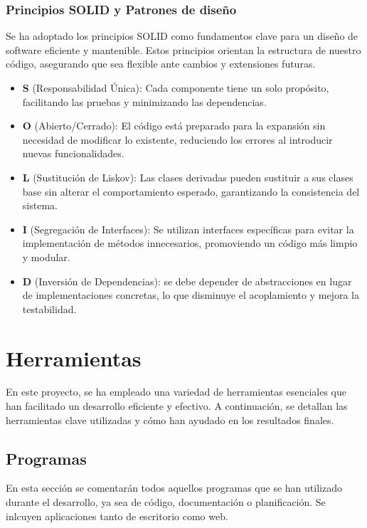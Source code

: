 \subsubsection{Principios SOLID y Patrones de diseño}
Se ha adoptado los principios SOLID como fundamentos clave para un diseño de software eficiente y mantenible. Estos principios orientan la estructura de nuestro código, asegurando que sea flexible ante cambios y extensiones futuras. 
\begin{mdframed}[linewidth=1pt, linecolor=black, leftmargin=10, rightmargin=10, backgroundcolor=gray!10, roundcorner=30pt]
		\begin{itemize}
		\item \textbf{S} (Responsabilidad Única): Cada componente tiene un solo propósito, facilitando las pruebas y minimizando las dependencias.
		\item \textbf{O} (Abierto/Cerrado): El código está preparado para la expansión sin necesidad de modificar lo existente, reduciendo los errores al introducir nuevas funcionalidades.
		\item \textbf{L} (Sustitución de Liskov): Las clases derivadas pueden sustituir a sus clases base sin alterar el comportamiento esperado, garantizando la consistencia del sistema.
		\item \textbf{I} (Segregación de Interfaces): Se utilizan interfaces específicas para evitar la implementación de métodos innecesarios, promoviendo un código más limpio y modular.
		\item \textbf{D} (Inversión de Dependencias): se debe depender de abstracciones en lugar de implementaciones concretas, lo que disminuye el acoplamiento y mejora la testabilidad.
	\end{itemize}
\end{mdframed}

\section{Herramientas}
En este proyecto, se ha empleado una variedad de herramientas esenciales que han facilitado un desarrollo eficiente y efectivo. A continuación, se detallan las herramientas clave utilizadas y cómo han ayudado en los resultados finales.
\subsection{Programas}
En esta sección se comentarán todos aquellos programas que se han utilizado durante el desarrollo, ya sea de código, documentación o planificación. Se inlcuyen aplicaciones tanto de escritorio como web.

